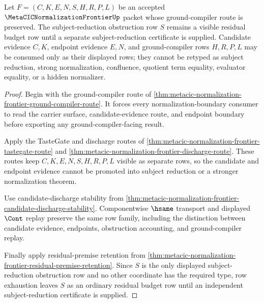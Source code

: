 \begin{theorem}
\label{thm:metacic-normalization-frontier-subject-reduction-residual-budget}
Let $F=(C,K,E,N,S,H,R,P,L)$ be an accepted $\MetaCICNormalizationFrontierUp$ packet whose ground-compiler route is preserved. The subject-reduction obstruction row $S$ remains a visible residual budget row until a separate subject-reduction certificate is supplied. Candidate evidence $C,K$, endpoint evidence $E,N$, and ground-compiler rows $H,R,P,L$ may be consumed only as their displayed rows; they cannot be retyped as subject reduction, strong normalization, confluence, quotient term equality, evaluator equality, or a hidden normalizer.
\end{theorem}
\begin{proof}
Begin with the ground-compiler route of \autoref{thm:metacic-normalization-frontier-ground-compiler-route}. It forces every normalization-boundary consumer to read the carrier surface, candidate-evidence route, and endpoint boundary before exporting any ground-compiler-facing result.

Apply the TasteGate and discharge routes of \autoref{thm:metacic-normalization-frontier-tastegate-route} and \autoref{thm:metacic-normalization-frontier-discharge-route}. These routes keep $C,K,E,N,S,H,R,P,L$ visible as separate rows, so the candidate and endpoint evidence cannot be promoted into subject reduction or a stronger normalization theorem.

Use candidate-discharge stability from \autoref{thm:metacic-normalization-frontier-candidate-discharge-stability}. Componentwise $\hsame$ transport and displayed $\Cont$ replay preserve the same row family, including the distinction between candidate evidence, endpoints, obstruction accounting, and ground-compiler replay.

Finally apply residual-premise retention from \autoref{thm:metacic-normalization-frontier-residual-premise-retention}. Since $S$ is the only displayed subject-reduction obstruction row and no other coordinate has the required type, row exhaustion leaves $S$ as an ordinary residual budget row until an independent subject-reduction certificate is supplied.
\end{proof}

